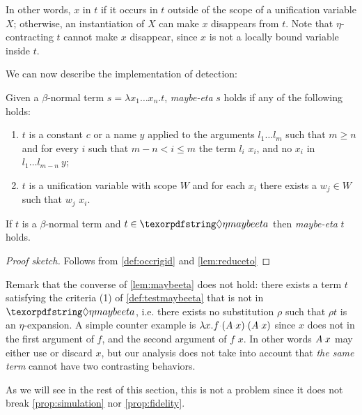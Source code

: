 \documentclass[sigconf,natbib=false,review]{acmart}
\newcommand{\appsep}{\ensuremath{\textcolor{lightgray}{\cdot}}}
\begin{document}
In other words, $x$ \occursrigid in $t$ if it occurs in $t$
outside of the scope of a unification variable $X$; otherwise, an instantiation
of $X$ can make $x$ disappears from $t$.
Note that $\eta$-contracting $t$ cannot make $x$ disappear, since
$x$ is not a locally bound variable inside $t$.

We can now describe the implementation of \maybeeta detection:

\newcommand{\testmaybeeta}{\emph{maybe-eta}\xspace}
\begin{definition}[\testmaybeeta]\label{def:testmaybeeta}
  Given a $\beta$-normal term
  $s = \lambda x_1 \ldots x_n.t$, \testmaybeeta{} $s$ holds if any
  of the following holds:
  \begin{enumerate}
    \item $t$ is a constant $c$ or a name $y$ applied to the arguments
      $l_1 \ldots l_m$ such that 
      $m \geq n$ and for every $i$ such that $m - n < i \leq m$
      the term  $l_i$
      \reduceto{} $x_i$, and
      no $x_i$ \occursrigid{} in $l_1 \ldots l_{m-n} ~ y$;
    \item $t$ is a
      unification variable with scope $W$ and
      for each $x_i$ there exists a $w_j \in W$ such that $w_j$
      \reduceto{} $x_i$.
  \end{enumerate}
\end{definition}
\begin{lemma}\label{lem:maybeeta}
  If $t$ is a $\beta$-normal term
  and
  $t \in \maybeeta$ then \testmaybeeta{} $t$ holds.
\end{lemma}
\begin{proof}[Proof sketch]
Follows from \cref{def:occrigid} and \cref{lem:reduceto}
\end{proof}

\noindent
Remark that the converse of \cref{lem:maybeeta} does not hold: 
there exists a term $t$ satisfying the criteria (1) of
\cref{def:testmaybeeta} that is not in $\maybeeta$, i.e.
there exists no substitution $\rho$ such that $\rho t$ is an
$\eta$-expansion. A simple counter example is
$\lambda x. f \appsep (A \appsep x) \appsep (A \appsep x)$
since $x$ does not \occurrigid{} in the first argument
of $f$,
and the second argument of $f$ \reduceto{} $x$.
In other words $A \appsep x$
may either use or discard $x$, but our analysis does not
take into account that \emph{the same
term} cannot have two contrasting behaviors.

As we will see in the rest of this section, this is not a problem
since it does not break
\cref{prop:simulation} nor \cref{prop:fidelity}.
\end{document}
